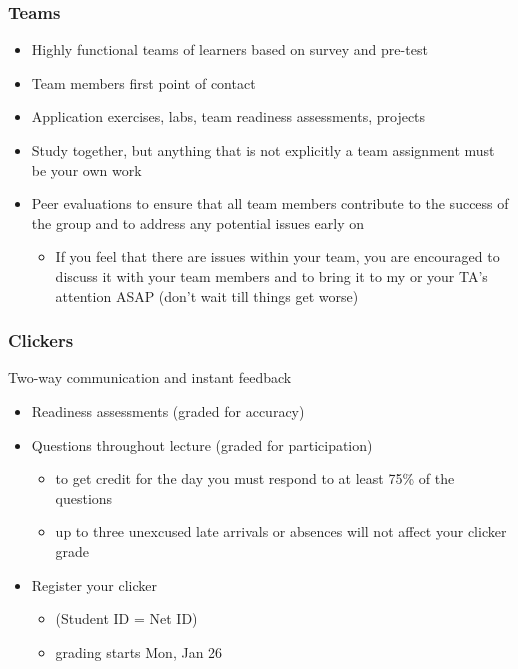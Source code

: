 \documentclass[slidestop,compress,mathserif,12pt,t,professionalfonts,xcolor=table]{beamer}
\begin{document}

\begin{frame}
\frametitle{Teams}

\begin{itemize}
\item Highly functional teams of learners based on survey and pre-test

\item Team members first point of contact

\item Application exercises, labs, team readiness assessments, projects

\item Study together, but anything that is not explicitly a team assignment must be your own work

\item Peer evaluations to ensure that all team members contribute to the success of the group and to address any potential issues early on
\begin{itemize}
\item If you feel that there are issues within your team, you are encouraged to discuss it with your team members and to bring it to my or your TA's attention ASAP (don't wait till things get worse)
\end{itemize}

\end{itemize}

\end{frame}


\begin{frame}
\frametitle{Clickers}

 Two-way communication and instant feedback

\begin{itemize}
\item Readiness assessments (graded for accuracy)

\item Questions throughout lecture (graded for participation)
\begin{itemize}
\item to get credit for the day you must respond to at least 75\% of the questions
\item up to three unexcused late arrivals or absences will not affect your clicker grade
\end{itemize}

\item Register your clicker
\begin{itemize}
\item {} (Student ID = Net ID)
\item grading starts Mon, Jan 26
\end{itemize}

\end{itemize}

\end{frame}
\end{document}
